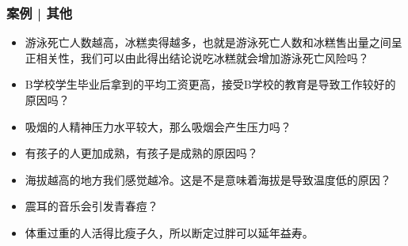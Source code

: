 
\begin{frame}
  \frametitle{案例 | 其他}
  \begin{itemize}
    \item 游泳死亡人数越高，冰糕卖得越多，也就是游泳死亡人数和冰糕售出量之间呈正相关性，我们可以由此得出结论说吃冰糕就会增加游泳死亡风险吗？
    \item B学校学生毕业后拿到的平均工资更高，接受B学校的教育是导致工作较好的原因吗？
    \item 吸烟的人精神压力水平较大，那么吸烟会产生压力吗？
    \item 有孩子的人更加成熟，有孩子是成熟的原因吗？
    \item 海拔越高的地方我们感觉越冷。这是不是意味着海拔是导致温度低的原因？
    \item 震耳的音乐会引发青春痘？
    \item 体重过重的人活得比瘦子久，所以断定过胖可以延年益寿。
  \end{itemize}
\end{frame}

